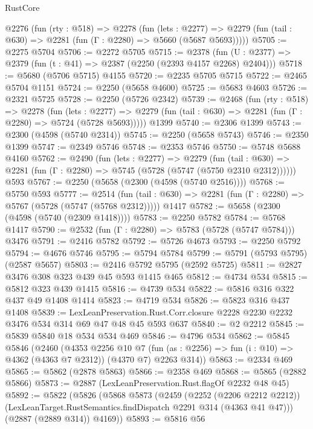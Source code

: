 \begin{lexlean}{RustCore}
\begin{coremodule}
  @2276
    (fun (rty : @518) =>
    @2278
      (fun (lets : @2277) =>
      @2279 (fun (tail : @630) => @2281 (fun (Γ : @2280) => @5660 (@5687 @5693)))))
@5705 := @2275 @5704
@5706 := @2272 @5705
@5715 := @2378 (fun (U : @2377) => @2379 (fun (t : @41) => @2387 (@2250 (@2393 @4157 @2268) @2404)))
@5718 := @5680 (@5706 @5715) @4155
@5720 := @2235 @5705 @5715
@5722 := @2465 @5704 @1151
@5724 := @2250 (@5658 @4600)
@5725 := @5683 @4603
@5726 := @2321 @5725
@5728 := @2250 (@5726 @2342)
@5739 := @2468
    (fun (rty : @518) =>
    @2278
      (fun (lets : @2277) =>
      @2279 (fun (tail : @630) => @2281 (fun (Γ : @2280) => @5724 (@5728 @5693)))))
    @1399
@5740 := @2306 @1399
@5743 := @2300 (@4598 (@5740 @2314))
@5745 := @2250 (@5658 @5743)
@5746 := @2350 @1399
@5747 := @2349 @5746
@5748 := @2353 @5746
@5750 := @5748 @5688 @4160
@5762 := @2490
    (fun (lets : @2277) =>
    @2279
      (fun (tail : @630) => @2281 (fun (Γ : @2280) => @5745 (@5728 (@5747 (@5750 @2310 @2312))))))
    @593
@5767 := @2250 (@5658 (@2300 (@4598 (@5740 @2516))))
@5768 := @5750 @593
@5777 := @2514
    (fun (tail : @630) => @2281 (fun (Γ : @2280) => @5767 (@5728 (@5747 (@5768 @2312)))))
    @1417
@5782 := @5658 (@2300 (@4598 (@5740 (@2309 @1418))))
@5783 := @2250 @5782
@5784 := @5768 @1417
@5790 := @2532 (fun (Γ : @2280) => @5783 (@5728 (@5747 @5784))) @3476
@5791 := @2416 @5782
@5792 := @5726 @4673
@5793 := @2250 @5792
@5794 := @4676 @5746
@5795 := @5794 @5784
@5799 := @5791 (@5793 @5795) (@2587 @5657)
@5803 := @2416 @5792 @5795 (@2592 @5725)
@5811 := @2827 @3476 @308 @323 @439 @45 @593 @1415 @465
@5812 := @4734 @534
@5815 := @5812 @323 @439 @1415
@5816 := @4739 @534
@5822 := @5816 @316 @322 @437 @49 @1408 @1414
@5823 := @4719 @534
@5826 := @5823 @316 @437 @1408
@5839 := LexLeanPreservation.Rust.Corr.closure
    @2228
    @2230
    @2232
    @3476
    @534
    @314
    @69
    @47
    @48
    @45
    @593
    @637
@5840 := @2 @2212
@5845 := @5839 @5840 @18 @534 @534 @469
@5846 := @4796 @534
@5862 := @5845
    @5846
    (@2460
      (@4353
        @2256
        @10
        @7
        (fun (as : @2256) => fun (i : @10) => @4362 (@4363 @7 @2312))
        (@4370 @7)
        @2263
        @314))
@5863 := @2334 @469
@5865 := @5862 (@2878 @5863)
@5866 := @2358 @469
@5868 := @5865 (@2882 @5866)
@5873 := @2887 (LexLeanPreservation.Rust.flagOf @2232 @48 @45)
@5892 := @5822
    (@5826
      (@5868
        @5873
        (@2459
          (@2252 (@2206 @2212 @2212))
          (LexLeanTarget.RustSemantics.findDispatch @2291 @314 (@4363 @41 @47)))
        (@2887 (@2889 @314))
        @4169))
@5893 := @5816 @56

\end{coremodule}
\end{lexlean}
